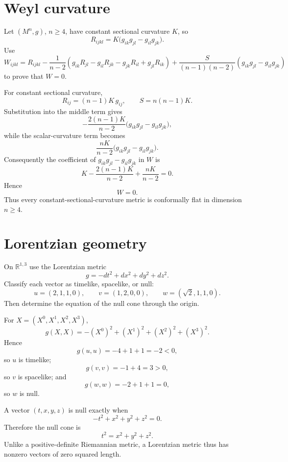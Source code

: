 \section{Weyl curvature}

\begin{problem}
\label{prob:vii-gap-28}
Let \((M^n,g)\), \(n\ge4\), have constant sectional curvature \(K\), so
\[
R_{ijkl}
=
K\bigl(g_{ik}g_{jl}-g_{il}g_{jk}\bigr).
\]
Use
\[
W_{ijkl}
=
R_{ijkl}
-\frac1{n-2}
\left(
g_{ik}R_{jl}-g_{il}R_{jk}
-g_{jk}R_{il}+g_{jl}R_{ik}
\right)
+\frac{S}{(n-1)(n-2)}
\left(
g_{ik}g_{jl}-g_{il}g_{jk}
\right)
\]
to prove that \(W=0\).
\end{problem}

\begin{solution}
For constant sectional curvature,
\[
R_{ij}=(n-1)K\,g_{ij},
\qquad
S=n(n-1)K.
\]
Substitution into the middle term gives
\[
-\frac{2(n-1)K}{n-2}
\bigl(g_{ik}g_{jl}-g_{il}g_{jk}\bigr),
\]
while the scalar-curvature term becomes
\[
\frac{nK}{n-2}
\bigl(g_{ik}g_{jl}-g_{il}g_{jk}\bigr).
\]
Consequently the coefficient of
\(g_{ik}g_{jl}-g_{il}g_{jk}\) in \(W\) is
\[
K-\frac{2(n-1)K}{n-2}+\frac{nK}{n-2}=0.
\]
Hence
\[
\boxed{W=0}.
\]
Thus every constant-sectional-curvature metric is conformally flat in
dimension \(n\ge4\).
\end{solution}


\section{Lorentzian geometry}

\begin{problem}
\label{prob:vii-gap-29}
On \(\mathbb{R}^{1,3}\) use the Lorentzian metric
\[
g=-dt^2+dx^2+dy^2+dz^2.
\]
Classify each vector as timelike, spacelike, or null:
\[
u=(2,1,1,0),\qquad
v=(1,2,0,0),\qquad
w=(\sqrt2,1,1,0).
\]
Then determine the equation of the null cone through the origin.
\end{problem}

\begin{solution}
For \(X=(X^0,X^1,X^2,X^3)\),
\[
g(X,X)=-(X^0)^2+(X^1)^2+(X^2)^2+(X^3)^2.
\]
Hence
\[
g(u,u)=-4+1+1=-2<0,
\]
so \(u\) is timelike;
\[
g(v,v)=-1+4=3>0,
\]
so \(v\) is spacelike; and
\[
g(w,w)=-2+1+1=0,
\]
so \(w\) is null.

A vector \((t,x,y,z)\) is null exactly when
\[
-t^2+x^2+y^2+z^2=0.
\]
Therefore the null cone is
\[
\boxed{t^2=x^2+y^2+z^2}.
\]
Unlike a positive-definite Riemannian metric, a Lorentzian metric thus
has nonzero vectors of zero squared length.
\end{solution}


